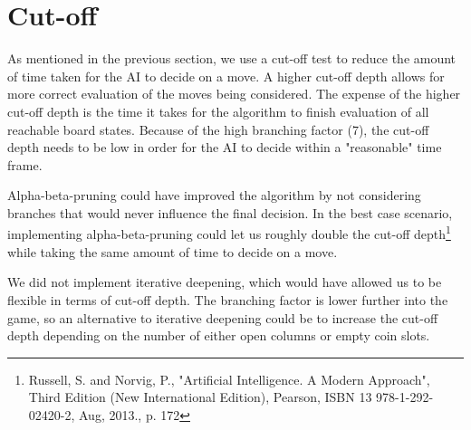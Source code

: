 \section{Cut-off}
\label{Cutoff}
As mentioned in the previous section, we use a cut-off test to reduce the amount of time taken for the AI to decide on a move. A higher cut-off depth allows for more correct evaluation of the moves being considered. The expense of the higher cut-off depth is the time it takes for the algorithm to finish evaluation of all reachable board states. Because of the high branching factor (7), the cut-off depth needs to be low in order for the AI to decide within a "reasonable" time frame.

Alpha-beta-pruning could have improved the algorithm by not considering branches that would never influence the final decision. In the best case scenario, implementing alpha-beta-pruning could let us roughly double the cut-off depth\footnote{Russell, S. and Norvig, P., "Artificial Intelligence. A Modern Approach", Third Edition (New International Edition), Pearson, ISBN 13 978-1-292-02420-2, Aug, 2013., p. 172} while taking the same amount of time to decide on a move.

We did not implement iterative deepening, which would have allowed us to be flexible in terms of cut-off depth. The branching factor is lower further into the game, so an alternative to iterative deepening could be to increase the cut-off depth depending on the number of either open columns or empty coin slots.
